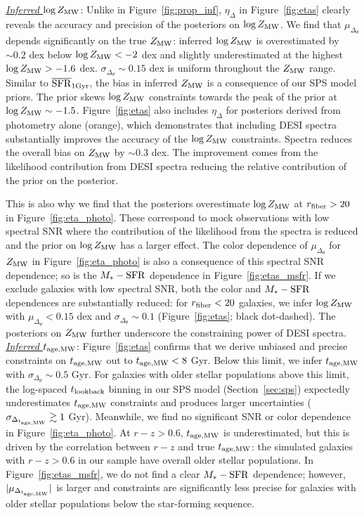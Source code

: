 \noindent \underline{\emph{Inferred $\log Z_{\rm MW}$}}:  
Unlike in Figure~\ref{fig:prop_inf}, $\eta_\Delta$ in Figure~\ref{fig:etas}
clearly reveals the accuracy and precision of the posteriors on $\log Z_{\rm MW}$. 
We find that $\mu_{\Delta_{\theta}}$ depends significantly on the true $Z_{\rm MW}$: 
inferred $\log Z_{\rm MW}$ is overestimated by ${\sim}0.2$ dex below $\log Z_{\rm MW} <
-2$ dex and slightly underestimated at the highest $\log Z_{\rm MW} > -1.6$ dex.
$\sigma_{\Delta_\theta} \sim 0.15$ dex is uniform throughout the $Z_{\rm MW}$ range.
Similar to $\overline{\rm SFR}_{\rm 1Gyr}$, the bias in inferred $Z_{\rm MW}$ is a consequence of our SPS
model priors. 
The prior skews $\log Z_{\rm MW}$ constraints towards the peak of the prior at
$\log Z_{\rm MW}\sim-1.5$. 
Figure~\ref{fig:etas} also includes $\eta_\Delta$ for posteriors derived from
photometry alone (orange), which demonstrates that including DESI spectra
substantially improves the accuracy of the $\log Z_{\rm MW}$ constraints.
Spectra reduces the overall bias on $Z_{\rm MW}$ by $\sim$0.3 dex. 
The improvement comes from the likelihood contribution from DESI spectra
reducing the relative contribution of the prior on the posterior. 

This is also why we find that the posteriors overestimate $\log Z_{\rm MW}$ at 
$r_{\rm fiber} > 20$ in Figure~\ref{fig:eta_photo}.
These correspond to mock observations with low spectral SNR where the
contribution of the likelihood from the spectra is reduced and the prior on
$\log Z_{\rm MW}$ has a larger effect.
The color dependence of $\mu_{\Delta_\theta}$ for $Z_{\rm MW}$ in
Figure~\ref{fig:eta_photo} is also a consequence of this spectral SNR
dependence; so is the $M_*-{\rm SFR}$ dependence in Figure~\ref{fig:etas_msfr}.
If we exclude galaxies with low spectral SNR, both the color and $M_*-{\rm
SFR}$  dependences are substantially reduced: for $r_{\rm fiber} < 20$
galaxies, we infer $\log Z_{\rm MW}$ with $\mu_{\Delta_\theta}<0.15$ dex and
$\sigma_{\Delta_\theta}\sim0.1$ (Figure~\ref{fig:etas}; black dot-dashed). 
The posteriors on $Z_{\rm MW}$ further underscore the constraining power of DESI
spectra. \\

\noindent \underline{\emph{Inferred $t_{\rm age, MW}$}}:  
Figure~\ref{fig:etas} confirms that we derive unbiased and precise constraints
on $t_{\rm age, MW}$ out to $t_{\rm age, MW} < 8$ Gyr. 
Below this limit, we infer $t_{\rm age, MW}$ with $\sigma_{\Delta_\theta}{\sim}0.5$ Gyr.
For galaxies with older stellar populations above this limit, the log-spaced
$t_{\rm lookback}$ binning in our SPS model (Section~\ref{sec:sps}) expectedly
underestimates $t_{\rm age, MW}$ constraints and produces larger uncertainties 
($\sigma_{\Delta_{t_{\rm age, MW}}} \gtrsim 1$ Gyr). 
Meanwhile, we find no significant SNR or color dependence in
Figure~\ref{fig:eta_photo}. 
At $r - z > 0.6$, $t_{\rm age, MW}$ is underestimated, but this is driven by the
correlation between $r-z$ and true $t_{\rm age, MW}$: the simulated galaxies with $r - z
> 0.6$ in our sample have overall older stellar populations. 
In Figure~\ref{fig:etas_msfr}, we do not find a clear $M_*-{\rm SFR}$
dependence; however, $|\mu_{\Delta_{t_{\rm age, MW}}}|$ is larger and constraints are
significantly less precise for galaxies with older stellar populations below
the star-forming sequence.  \\

